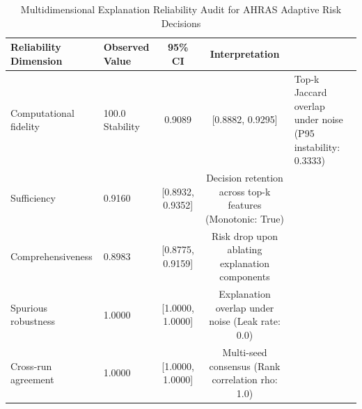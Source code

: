\begin{table}[t]
\centering
\caption{Multidimensional Explanation Reliability Audit for AHRAS Adaptive Risk Decisions}
\label{tab:xai_reliability}
\begin{tabular}{@{}llcc@{}}
\toprule
\textbf{Reliability Dimension} & \textbf{Observed Value} & \textbf{95\% CI} & \textbf{Interpretation} \\ \midrule
Computational fidelity & 100.0%
Stability & 0.9089 & [0.8882, 0.9295] & Top-k Jaccard overlap under noise (P95 instability: 0.3333) \\
Sufficiency & 0.9160 & [0.8932, 0.9352] & Decision retention across top-k features (Monotonic: True) \\
Comprehensiveness & 0.8983 & [0.8775, 0.9159] & Risk drop upon ablating explanation components \\
Spurious robustness & 1.0000 & [1.0000, 1.0000] & Explanation overlap under noise (Leak rate: 0.0) \\
Cross-run agreement & 1.0000 & [1.0000, 1.0000] & Multi-seed consensus (Rank correlation rho: 1.0) \\
\bottomrule
\end{tabular}
\end{table}
